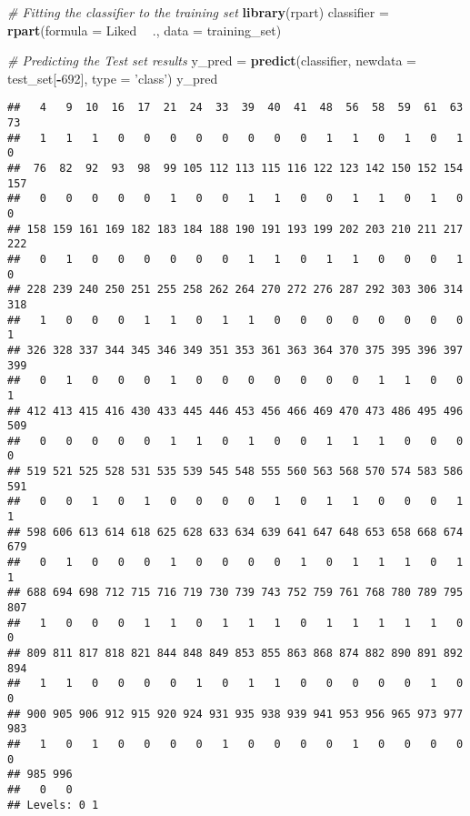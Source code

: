 \documentclass[]{article}
\newenvironment{Shaded}{\begin{snugshade}}{\end{snugshade}}
\newcommand{\CommentTok}[1]{\textcolor[rgb]{0.56,0.35,0.01}{\textit{#1}}}
\newcommand{\DataTypeTok}[1]{\textcolor[rgb]{0.13,0.29,0.53}{#1}}
\newcommand{\DecValTok}[1]{\textcolor[rgb]{0.00,0.00,0.81}{#1}}
\newcommand{\KeywordTok}[1]{\textcolor[rgb]{0.13,0.29,0.53}{\textbf{#1}}}
\newcommand{\NormalTok}[1]{#1}
\newcommand{\OperatorTok}[1]{\textcolor[rgb]{0.81,0.36,0.00}{\textbf{#1}}}
\newcommand{\StringTok}[1]{\textcolor[rgb]{0.31,0.60,0.02}{#1}}
\begin{document}
\begin{Shaded}
\begin{Highlighting}[]
\CommentTok{# Fitting the classifier to the training set}
\KeywordTok{library}\NormalTok{(rpart)}
\NormalTok{classifier =}\StringTok{ }\KeywordTok{rpart}\NormalTok{(}\DataTypeTok{formula =}\NormalTok{ Liked }\OperatorTok{~}\StringTok{ }\NormalTok{., }
                   \DataTypeTok{data =}\NormalTok{ training_set)      }
\end{Highlighting}
\end{Shaded}

\begin{Shaded}
\begin{Highlighting}[]
\CommentTok{# Predicting the Test set results}
\NormalTok{y_pred =}\StringTok{ }\KeywordTok{predict}\NormalTok{(classifier, }\DataTypeTok{newdata =}\NormalTok{ test_set[}\OperatorTok{-}\DecValTok{692}\NormalTok{], }\DataTypeTok{type =} \StringTok{'class'}\NormalTok{)}
\NormalTok{y_pred}
\end{Highlighting}
\end{Shaded}

\begin{verbatim}
##   4   9  10  16  17  21  24  33  39  40  41  48  56  58  59  61  63  73 
##   1   1   1   0   0   0   0   0   0   0   0   1   1   0   1   0   1   0 
##  76  82  92  93  98  99 105 112 113 115 116 122 123 142 150 152 154 157 
##   0   0   0   0   0   1   0   0   1   1   0   0   1   1   0   1   0   0 
## 158 159 161 169 182 183 184 188 190 191 193 199 202 203 210 211 217 222 
##   0   1   0   0   0   0   0   0   1   1   0   1   1   0   0   0   1   0 
## 228 239 240 250 251 255 258 262 264 270 272 276 287 292 303 306 314 318 
##   1   0   0   0   1   1   0   1   1   0   0   0   0   0   0   0   0   1 
## 326 328 337 344 345 346 349 351 353 361 363 364 370 375 395 396 397 399 
##   0   1   0   0   0   1   0   0   0   0   0   0   0   1   1   0   0   1 
## 412 413 415 416 430 433 445 446 453 456 466 469 470 473 486 495 496 509 
##   0   0   0   0   0   1   1   0   1   0   0   1   1   1   0   0   0   0 
## 519 521 525 528 531 535 539 545 548 555 560 563 568 570 574 583 586 591 
##   0   0   1   0   1   0   0   0   0   1   0   1   1   0   0   0   1   1 
## 598 606 613 614 618 625 628 633 634 639 641 647 648 653 658 668 674 679 
##   0   1   0   0   0   1   0   0   0   0   1   0   1   1   1   0   1   1 
## 688 694 698 712 715 716 719 730 739 743 752 759 761 768 780 789 795 807 
##   1   0   0   0   1   1   0   1   1   1   0   1   1   1   1   1   0   0 
## 809 811 817 818 821 844 848 849 853 855 863 868 874 882 890 891 892 894 
##   1   1   0   0   0   0   1   0   1   1   0   0   0   0   0   1   0   0 
## 900 905 906 912 915 920 924 931 935 938 939 941 953 956 965 973 977 983 
##   1   0   1   0   0   0   0   1   0   0   0   0   1   0   0   0   0   0 
## 985 996 
##   0   0 
## Levels: 0 1
\end{verbatim}
\end{document}
